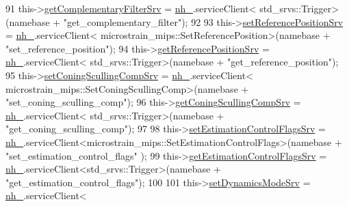 \begin{DoxyCode}
91                 this->\hyperlink{classcl__microstrain__mips_1_1ClMicrostainMips_a39aa3d9d1bbe86d90548f7422aa0b4a4}{getComplementaryFilterSrv} = \hyperlink{classcl__microstrain__mips_1_1ClMicrostainMips_a5a39ba0864ba2c4c003b6ea427538243}{nh\_}.serviceClient<
      std\_srvs::Trigger>(namebase + \textcolor{stringliteral}{"get\_complementary\_filter"});
92 
93                 this->\hyperlink{classcl__microstrain__mips_1_1ClMicrostainMips_a778117029f93a6cff9c5e2a0dac9742b}{setReferencePositionSrv} = \hyperlink{classcl__microstrain__mips_1_1ClMicrostainMips_a5a39ba0864ba2c4c003b6ea427538243}{nh\_}.serviceClient<
      microstrain\_mips::SetReferencePosition>(namebase + \textcolor{stringliteral}{"set\_reference\_position"});
94                 this->\hyperlink{classcl__microstrain__mips_1_1ClMicrostainMips_a1f9b56f826c67a2e1d8a33e0879053bc}{getReferencePositionSrv} = \hyperlink{classcl__microstrain__mips_1_1ClMicrostainMips_a5a39ba0864ba2c4c003b6ea427538243}{nh\_}.serviceClient<
      std\_srvs::Trigger>(namebase + \textcolor{stringliteral}{"get\_reference\_position"});
95                 this->\hyperlink{classcl__microstrain__mips_1_1ClMicrostainMips_ae24545c615e2be170adced3999d94d84}{setConingScullingCompSrv} = \hyperlink{classcl__microstrain__mips_1_1ClMicrostainMips_a5a39ba0864ba2c4c003b6ea427538243}{nh\_}.serviceClient<
      microstrain\_mips::SetConingScullingComp>(namebase + \textcolor{stringliteral}{"set\_coning\_sculling\_comp"});
96                 this->\hyperlink{classcl__microstrain__mips_1_1ClMicrostainMips_a877393b5cf4c313e0e433e9c92163265}{getConingScullingCompSrv} = \hyperlink{classcl__microstrain__mips_1_1ClMicrostainMips_a5a39ba0864ba2c4c003b6ea427538243}{nh\_}.serviceClient<
      std\_srvs::Trigger>(namebase + \textcolor{stringliteral}{"get\_coning\_sculling\_comp"});
97 
98                 this->\hyperlink{classcl__microstrain__mips_1_1ClMicrostainMips_a2eeff01aea4a41fd5d24ff2f77daf584}{setEstimationControlFlagsSrv} = 
      \hyperlink{classcl__microstrain__mips_1_1ClMicrostainMips_a5a39ba0864ba2c4c003b6ea427538243}{nh\_}.serviceClient<microstrain\_mips::SetEstimationControlFlags>(namebase + \textcolor{stringliteral}{"set\_estimation\_control\_flags"}
      );
99                 this->\hyperlink{classcl__microstrain__mips_1_1ClMicrostainMips_a64039ee26cf8a290b3c22b787b8868a5}{getEstimationControlFlagsSrv} = 
      \hyperlink{classcl__microstrain__mips_1_1ClMicrostainMips_a5a39ba0864ba2c4c003b6ea427538243}{nh\_}.serviceClient<std\_srvs::Trigger>(namebase + \textcolor{stringliteral}{"get\_estimation\_control\_flags"});
100 
101                 this->\hyperlink{classcl__microstrain__mips_1_1ClMicrostainMips_a43a684f4010debc4a2ba17d9784712d6}{setDynamicsModeSrv} = \hyperlink{classcl__microstrain__mips_1_1ClMicrostainMips_a5a39ba0864ba2c4c003b6ea427538243}{nh\_}.serviceClient<

\end{DoxyCode}
